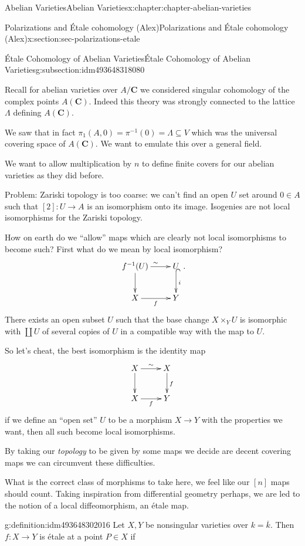 \documentclass[oneside,10pt,]{book}
\numberwithin{equation}{section}
\newcommand{\lb}{[}
\newcommand{\rb}{]}
\newcommand{\CC}{\mathbf{C}}
\begin{document}
\begin{chapterptx}{Abelian Varieties}{}{Abelian Varieties}{}{}{x:chapter:chapter-abelian-varieties}
\begin{sectionptx}{Polarizations and Étale cohomology (Alex)}{}{Polarizations and Étale cohomology (Alex)}{}{}{x:section:sec-polarizations-etale}
\begin{subsectionptx}{Étale Cohomology of Abelian Varieties}{}{Étale Cohomology of Abelian Varieties}{}{}{g:subsection:idm493648318080}
\par
Recall for abelian varieties over \(A/\CC\) we considered singular cohomology of the complex points \(A(\CC)\). Indeed this theory was strongly connected to the lattice \(\Lambda\) defining \(A(\CC)\).%
\par
We saw that in fact \(\pi_1(A,0) = \pi^{-1} (0) = \Lambda \subseteq V\) which was the universal covering space of \(A(\CC)\). We want to emulate this over a general field.%
\par
We want to allow multiplication by \(n\) to define finite covers for our abelian varieties as they did before.%
\par
Problem: Zariski topology is too coarse: we can't find an open \(U\) set around \(0 \in A\) such that \(\lb 2\rb \colon U \to A\) is an isomorphism onto its image. Isogenies are not local isomorphisms for the Zariski topology.%
\par
How on earth do we ``allow'' maps which are clearly not local isomorphisms to become such? First what do we mean by local isomorphism?%
\begin{equation*}
\xymatrix{
f^{-1}(U)\ar[d] \ar[r]^{\sim} & U\ar@{^(->}[d]^i\\
X \ar[r]_f & Y
}\text{.}
\end{equation*}
There exists an open subset \(U\) such that the base change \(X \times_Y U\) is isomorphic with \(\coprod U\) of several copies of \(U\) in a compatible way with the map to \(U\).%
\par
So let's cheat, the best isomorphism is the identity map%
\begin{equation*}
\xymatrix{
X\ar[d] \ar[r]^{\sim} & X\ar[d]^f\\
X \ar[r]_f & Y
}
\end{equation*}
if we define an ``open set'' \(U\) to be a morphism \(X \to Y\) with the properties we want, then all such become local isomorphisms.%
\par
By taking our \emph{topology} to be given by some maps we decide are decent covering maps we can circumvent these difficulties.%
\par
What is the correct class of morphisms to take here, we feel like our \(\lb n\rb\) maps should count. Taking inspiration from differential geometry perhaps, we are led to the notion of a local diffeomorphism, an étale map.%
\begin{definition}{}{g:definition:idm493648302016}%
Let \(X,Y\) be nonsingular varieties over \(k = \overline k\). Then \(f\colon X\to Y\) is étale at a point \(P\in X\) if%

\end{definition}
\end{subsectionptx}
\end{sectionptx}
\end{chapterptx}
\end{document}
